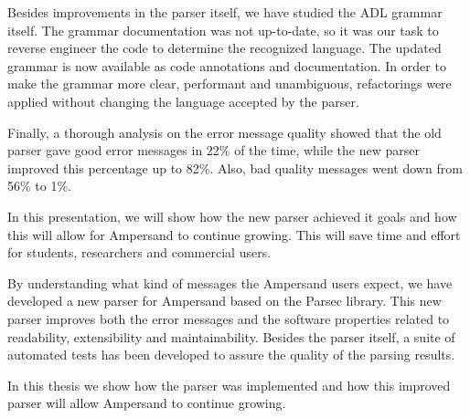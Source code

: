 Besides improvements in the parser itself, we have studied the ADL grammar itself.
The grammar documentation was not up-to-date, so it was our task to reverse engineer the code to determine the recognized language.
The updated grammar is now available as code annotations and documentation.
In order to make the grammar more clear, performant and unambiguous, refactorings were applied without changing the language accepted by the parser.

Finally, a thorough analysis on the error message quality showed that the old parser gave good error messages in 22\% of the time, while the new parser improved this percentage up to 82\%.
Also, bad quality messages went down from 56\% to 1\%.

In this presentation, we will show how the new parser achieved it goals and how this will allow for Ampersand to continue growing.
This will save time and effort for students, researchers and commercial users.

By understanding what kind of messages the Ampersand users expect, we have developed a new parser for Ampersand based on the Parsec library.
This new parser improves both the error messages and the software properties related to readability, extensibility and maintainability.
Besides the parser itself, a suite of automated tests has been developed to assure the quality of the parsing results.

In this thesis we show how the parser was implemented and how this improved parser will allow Ampersand to continue growing.